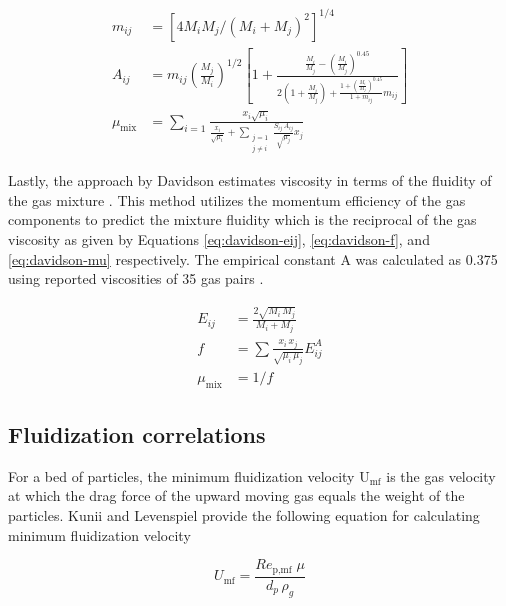 \begin{align}
    m_{ij} &= \left[ 4 M_i M_j / (M_i + M_j)^2 \right]^{1/4} \label{eq:brokaw-mij} \\
    A_{ij} &= m_{ij}\left( \frac{M_j}{M_i} \right)^{1/2} \left[ 1 + \frac{\frac{M_i}{M_j} - \left(\frac{M_i}{M_j} \right)^{0.45} }{ 2 \left(1 + \frac{M_i}{M_j} \right) + \frac{1 + \left(\frac{M_i}{M_j} \right)^{0.45}}{1 + m_{ij}} m_{ij}} \right] \label{eq:brokaw-aij} \\
    \mu_{\text{mix}} &= \sum_{i=1} \frac{x_i \sqrt{\mu_i}}{\frac{x_i}{\sqrt{\mu_i}} + \sum_{\substack{j=1 \\ j \neq i}} \frac{S_{ij} \, A_{ij}}{\sqrt{\mu_j}} x_j} \label{eq:brokaw-mu}
\end{align}

\noindent Lastly, the approach by Davidson estimates viscosity in terms of the fluidity of the gas mixture \cite{Davidson-1993}. This method utilizes the momentum efficiency of the gas components to predict the mixture fluidity which is the reciprocal of the gas viscosity as given by Equations \ref{eq:davidson-eij}, \ref{eq:davidson-f}, and \ref{eq:davidson-mu} respectively. The empirical constant A was calculated as 0.375 using reported viscosities of 35 gas pairs \cite{Davidson-1993}.

\begin{align}
    E_{ij} &= \frac{2 \sqrt{M_i\, M_j}}{M_i + M_j} \label{eq:davidson-eij} \\
    f &= \sum \frac{x_i\, x_j}{\sqrt{\mu_i\, \mu_j}} E_{ij}^A \label{eq:davidson-f} \\
    \mu_\text{mix} &= 1 / f \label{eq:davidson-mu}
\end{align}


\subsection{Fluidization correlations}

For a bed of particles, the minimum fluidization velocity U$_\text{mf}$ is the gas velocity at which the drag force of the upward moving gas equals the weight of the particles. Kunii and Levenspiel \cite{Levenspiel-1991} provide the following equation for calculating minimum fluidization velocity

\begin{equation}
    U_\text{mf} = \frac{Re_\text{p,mf}\; \mu}{d_p\, \rho_g}
\end{equation}

